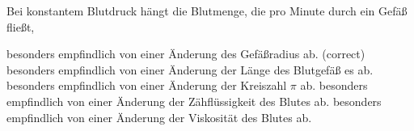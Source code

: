 \documentclass[11pt]{exam}
\begin{document}
\begin{questions}
\vspace{3mm}\question Bei konstantem Blutdruck hängt die Blutmenge, die pro Minute durch ein Gefäß fließt,

\begin{choices}
	\choice besonders empfindlich von einer Änderung des Gefäßradius ab. (correct)
	\choice besonders empfindlich von einer Änderung der Länge des Blutgefäß es ab.
	\choice besonders empfindlich von einer Änderung der Kreiszahl \(\pi\) ab.
	\choice besonders empfindlich von einer Änderung der Zähflüssigkeit des Blutes ab.
	\choice besonders empfindlich von einer Änderung der Viskosität des Blutes ab.
\end{choices}

\vspace{3mm}\end{questions}
\end{document}
